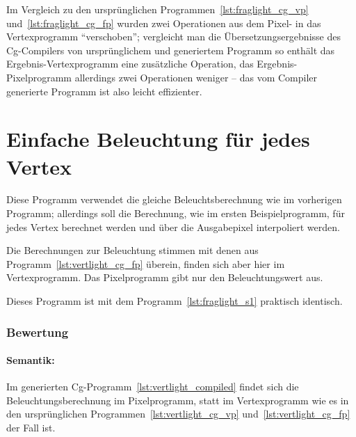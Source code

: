 \documentclass[twoside,a4paper,fleqn,12pt]{book}
\begin{document}
Im Vergleich zu den ursprünglichen Programmen~\ref{lst:fraglight_cg_vp} und~\ref{lst:fraglight_cg_fp}
wurden zwei Operationen aus dem Pixel- in das Vertexprogramm "`verschoben"'; vergleicht man
die Übersetzungsergebnisse des Cg-Compilers von ursprünglichem und generiertem Programm
so enthält das Ergebnis-Vertexprogramm eine zusätzliche Operation,
das Ergebnis-Pixelprogramm allerdings zwei Operationen weniger -- das vom Compiler generierte Programm
ist also leicht effizienter.

\section{Einfache Beleuchtung für jedes Vertex}

Diese Programm verwendet die gleiche Beleuchtsberechnung wie im vorherigen Programm; allerdings soll die Berechnung,
wie im ersten Beispielprogramm, für jedes Vertex berechnet werden und über die Ausgabepixel interpoliert werden.

{}

{}

Die Berechnungen zur Beleuchtung stimmen mit denen aus Programm~\ref{lst:vertlight_cg_fp} überein,
finden sich aber hier im Vertexprogramm. Das Pixelprogramm gibt nur den Beleuchtungswert aus.

{}

Dieses Programm ist mit dem Programm~\ref{lst:fraglight_s1} praktisch identisch.

{}

\subsubsection*{Bewertung}
\paragraph{Semantik:}
Im generierten Cg-Programm~\ref{lst:vertlight_compiled} findet sich die Beleuchtungsberechnung im
Pixelprogramm, statt im Vertexprogramm wie es in den ursprünglichen Programmen~\ref{lst:vertlight_cg_vp}
und~\ref{lst:vertlight_cg_fp} der Fall ist.
\end{document}
